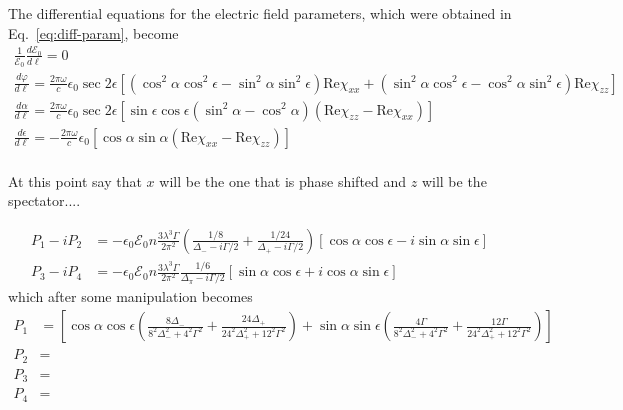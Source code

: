 \documentclass[11pt,letter]{article}
\newcommand{\efieldo}{\ensuremath{\mathcal{E}_{0}}}
\begin{document}
The differential equations for the electric field parameters, which were
obtained in Eq.~\ref{eq:diff-param}, become 
\begin{align} 
 \frac{1}{\efieldo} \frac{d \efieldo }{ d \ell} = 0 \\  
 \frac{ d \varphi }{d \ell} = 
     \frac{2\pi\omega}{c} \epsilon_{0} \sec 2 \epsilon[
            ( \cos^{2}\alpha\cos^{2}\epsilon - \sin^{2}\alpha\sin^{2}\epsilon) 
            \text{Re}\chi_{xx}  
         +  ( \sin^{2}\alpha\cos^{2}\epsilon - \cos^{2}\alpha\sin^{2}\epsilon) 
            \text{Re}\chi_{zz}  ]  \\ 
 \frac{ d \alpha}{ d \ell} = 
     \frac{2\pi\omega}{c} \epsilon_{0} \sec 2 \epsilon[
            \sin\epsilon\cos\epsilon
            ( \sin^{2}\alpha - \cos^{2}\alpha)
            ( \text{Re}\chi_{zz} - \text{Re}\chi_{xx} ) ] \\ 
 \frac{ d \epsilon}{ d \ell} = 
     - \frac{2\pi\omega}{c} \epsilon_{0} [
            \cos\alpha \sin\alpha ( \text{Re}\chi_{xx} - \text{Re}\chi_{zz} ) ]\\ 
\end{align}

At this point say that $x$ will be the one that is phase shifted and $z$ will
be the spectator....












\begin{equation}
\begin{split}
  P_{1} - i P_{2} & = -\epsilon_{0} \efieldo n 
       \frac{ 3 \lambda^{3}\Gamma}{2 \pi^{2}} 
       \left( \frac{1/8}{\Delta_{-} - i \Gamma/2 } 
       +  \frac{1/24}{\Delta_{+} - i \Gamma/2 }  \right)  
      [\cos\alpha \cos \epsilon - i \sin\alpha\sin\epsilon] \\
  P_{3} - i P_{4} & = -\epsilon_{0} \efieldo n 
       \frac{ 3 \lambda^{3}\Gamma}{2 \pi^{2}} 
              \frac{1/6}{\Delta_{\pi} - i \Gamma/2 } 
      [\sin\alpha \cos\epsilon + i \cos\alpha\sin\epsilon]
\end{split}
\end{equation}
which after some manipulation becomes
\begin{equation}
\begin{split}
  P_{1} &=  \left[
             \cos\alpha\cos\epsilon \left( 
             \frac{8\Delta_{-}}{8^{2}\Delta_{-}^{2} + 4^{2} \Gamma^{2}} 
            +\frac{24\Delta_{+}}{24^{2}\Delta_{+}^{2} + 12^{2}\Gamma^{2}} 
             \right) 
          +  \sin\alpha\sin\epsilon \left(
             \frac{4\Gamma}{ 8^{2}\Delta_{-}^{2} + 4^{2}\Gamma^{2}} 
            +\frac{12\Gamma}{ 24^{2}\Delta_{+}^{2} + 12^{2}\Gamma^{2} } 
             \right)
            \right] \\
  P_{2} &= \\ 
  P_{3} &= \\
  P_{4} &= \\ 
\end{split}
\end{equation} 
\end{document}
